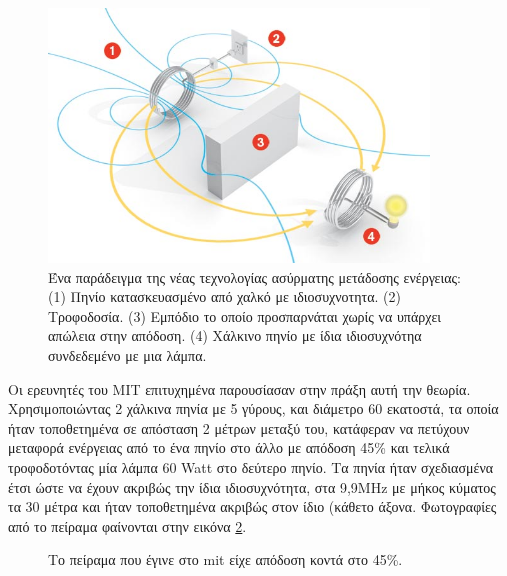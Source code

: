 \begin{figure}[h]
	\centering
	\includegraphics[width=0.9\textwidth]{images/mit_exper0.jpg}
	\caption{Ένα παράδειγμα της νέας τεχνολογίας ασύρματης μετάδοσης ενέργειας: (1) Πηνίο κατασκευασμένο από χαλκό με ιδιοσυχνοτητα.
    (2) Τροφοδοσία. (3) Εμπόδιο το οποίο προσπαρνάται χωρίς να υπάρχει απώλεια στην απόδοση. (4) Χάλκινο πηνίο με ίδια ιδιοσυχνότηα συνδεδεμένο με μια λάμπα.}
	\label{fig:mit_exper0}
\end{figure}


Οι ερευνητές του MIT επιτυχημένα παρουσίασαν στην πράξη αυτή την θεωρία. Χρησιμοποιώντας 2 χάλκινα πηνία με 5 γύρους, και διάμετρο 60 εκατοστά, τα οποία ήταν
τοποθετημένα σε απόσταση 2 μέτρων μεταξύ του, κατάφεραν να πετύχουν μεταφορά ενέργειας από το ένα πηνίο στο άλλο με απόδοση 45\% και τελικά τροφοδοτόντας μία λάμπα
60 Watt στο δεύτερο πηνίο. Τα πηνία ήταν σχεδιασμένα έτσι ώστε να έχουν ακριβώς την ίδια ιδιοσυχνότητα, στα 9,9MHz με μήκος κύματος τα 30 μέτρα και ήταν τοποθετημένα
ακριβώς στον ίδιο (κάθετο άξονα. Φωτογραφίες από το πείραμα φαίνονται στην εικόνα \ref{fig:mit_eperiments}.
\begin{figure}[h]
  \centering
  \caption{Το πείραμα που έγινε στο mit είχε απόδοση κοντά στο 45\%.}
  \label{fig:mit_eperiments}
\end{figure}

